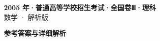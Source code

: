 \documentclass[zihao=-4, a4paper]{ctexart}
\begin{document}
\begin{center}
  {\Large\bfseries 2005 年·普通高等学校招生考试·全国卷Ⅲ·理科}\\[4pt]
  {\large 数学 · 解析版}
\end{center}
\medskip
{}

\clearpage
{}
\begin{center}{\Large\bfseries 参考答案与详细解析}\end{center}
\medskip

\end{document}
